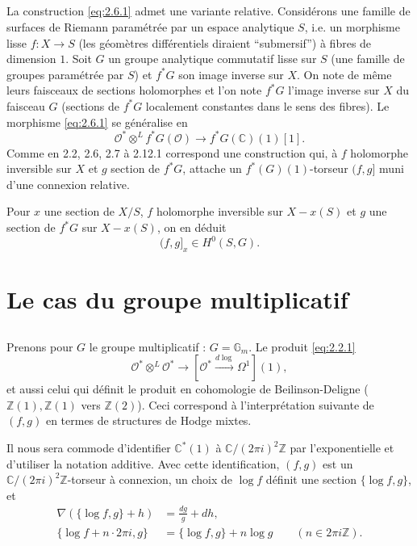\documentclass[12pt,a4paper]{article}
\theoremstyle{plain}
\theoremstyle{definition}
\theoremstyle{remark}
\newcommand{\cO}{\mathcal{O}}
\newcommand{\Z}{\mathbb{Z}}
\newcommand{\C}{\mathbb{C}}
\newcommand{\Gm}{\mathbb{G}_m}
\providecommand{\Gm}{\mathbb{G}_{\mathrm m}}
\providecommand{\cO}{\mathcal{O}}
\begin{document}
\subsection{}

La construction \eqref{eq:2.6.1} admet une variante relative. Considérons une famille
de surfaces de Riemann paramétrée par un espace analytique $S$, i.e. un morphisme
lisse $f : X \to S$ (les géomètres différentiels diraient ``submersif'') à fibres de dimension $1$.
Soit $G$ un groupe analytique commutatif lisse sur $S$ (une famille de groupes paramétrée
par $S$) et $f^*G$ son image inverse sur $X$. On note de même leurs faisceaux de sections holomorphes et l'on note $f^*G$ l'image inverse sur $X$ du faisceau $G$ (sections de $f^*G$ localement constantes dans le sens des fibres). Le morphisme \eqref{eq:2.6.1} se généralise en
\begin{equation}\label{eq:2.12.1}
\cO^* \otimes^L f^*G(\cO) \to f^*G(\C)(1)[1].
\end{equation}
Comme en 2.2, 2.6, 2.7 à 2.12.1 correspond une construction qui, à $f$ holomorphe inversible sur $X$ et $g$ section de $f^*G$, attache un $f^*(G)(1)$-torseur $(f,g]$ muni d'une connexion
relative.

Pour $x$ une section de $X/S$, $f$ holomorphe inversible sur $X - x(S)$ et $g$ une section
de $f^*G$ sur $X - x(S)$, on en déduit
\begin{equation}\label{eq:2.12.2}
(f,g]_x \in H^0(S, G).
\end{equation}

\section{Le cas du groupe multiplicatif}

\subsection{}

Prenons pour $G$ le groupe multiplicatif : $G = \Gm$. Le produit \eqref{eq:2.2.1}
\begin{equation}\label{eq:3.1.1}
\cO^* \otimes^L \cO^* \to [\cO^* \xrightarrow{d\log} \Omega^1](1),
\end{equation}
et aussi celui qui définit le produit en cohomologie de Beilinson-Deligne ($\Z(1), \Z(1)$
vers $\Z(2)$). Ceci correspond à l'interprétation suivante de $(f,g)$ en termes de structures
de Hodge mixtes.

Il nous sera commode d'identifier $\C^*(1)$ à $\C/(2\pi i)^2\Z$ par l'exponentielle et d'utiliser
la notation additive. Avec cette identification, $(f,g)$ est un $\C/(2\pi i)^2\Z$-torseur à connexion,
un choix de $\log f$ définit une section $\{\log f, g\}$, et
\begin{align*}
\nabla(\{\log f, g\} + h) &= \frac{dg}{g} + dh, \\
\{\log f + n \cdot 2\pi i, g\} &= \{\log f, g\} + n \log g \qquad (n \in 2\pi i\Z).
\end{align*}
\end{document}
